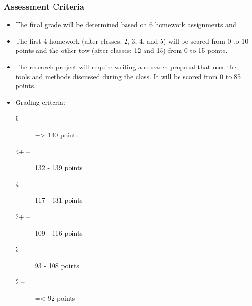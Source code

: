 \documentclass{beamer}
\begin{document}
\begin{frame}
    \frametitle{Assessment Criteria}
    \begin{itemize}
        \item The final grade will be determined based on \alert{6 homework
        assignments} and 
        \item The first 4 homework (after classes: 2, 3, 4, and 5) will be scored from 0 to 10 points and the
        other tow (after classes: 12 and 15) from 0 to 15 points.
        \item The research project will require writing a research proposal that uses the tools and methods discussed during the class. It will be scored from 0 to 85 points.
        \item Grading criteria:
    \begin{description}
        \item [5\phantom{+} --] => 140 points
        \item [4+ --] 132 - 139 points
        \item [4\phantom{+} --] 117 - 131 points
        \item [3+ --] 109 - 116 points
        \item [3\phantom{+} --] 93 - 108 points
        \item [2\phantom{+} --] =< 92 points
    \end{description}
\end{itemize}
\end{frame}
\end{document}
